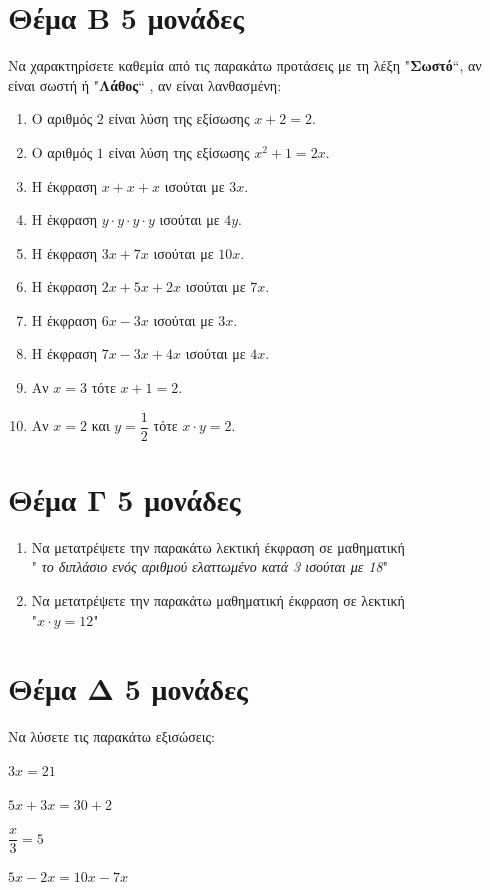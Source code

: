 \documentclass[a4paper,11pt]{report}
\begin{document}
\section*{Θέμα Β \hfill \small{5 μονάδες}}
Να χαρακτηρίσετε καθεμία από τις παρακάτω προτάσεις με τη λέξη "\textbf{Σωστό}``, αν είναι σωστή ή  
"\textbf{Λάθος}`` , αν είναι λανθασμένη:
\begin{enumerate}[1)]
 \item Ο αριθμός $2$ είναι λύση της εξίσωσης $x+2=2.$
 \item Ο αριθμός $1$ είναι λύση της εξίσωσης $x^{2}+1=2x$.
 \item Η έκφραση $x+x+x$ ισούται με $3x$.
 \item Η έκφραση $y\cdot y \cdot y \cdot y$ ισούται με $4y$.
 \item Η έκφραση $3x+7x$ ισούται με $10x$.
 \item Η έκφραση $2x+5x+2x$ ισούται με $7x$.
 \item Η έκφραση $6x-3x$ ισούται με $3x$.
 \item Η έκφραση $7x-3x+4x$ ισούται με $4x$.
 \item Αν $x=3$ τότε $x+1=2$.
 \item Αν $x=2$ και $y=\dfrac{1}{2}$ τότε $x\cdot y =2$.
\end{enumerate}


\section*{Θέμα Γ \hfill \small{5 μονάδες}}
\begin{enumerate}[1)]
 \item Να μετατρέψετε την παρακάτω λεκτική  έκφραση σε μαθηματική \\
       " \textit{το διπλάσιο ενός αριθμού ελαττωμένο κατά 3 ισούται με 18}"
 \item Να μετατρέψετε την παρακάτω μαθηματική  έκφραση σε λεκτική \\
       "$x\cdot y=12$"
\end{enumerate}

\section*{Θέμα Δ \hfill \small{5 μονάδες}}
Να λύσετε τις παρακάτω εξισώσεις:
\begin{enumerate}[i)]
\begin{multicols}{2}
 \item $3x=21$
 \item $5x+3x=30+2$
 \item $\dfrac{x}{3}=5$
 \item $5x-2x=10x-7x$
 \end{multicols}
\end{enumerate}
\end{document}

